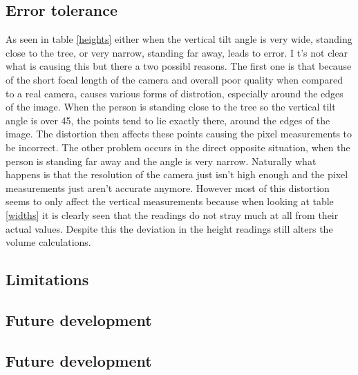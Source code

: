 \subsection{Error tolerance}
As seen in table \ref{heights} either when the vertical tilt angle is very wide, 
standing close to the tree, or very narrow, standing far away, leads to error. I
t's not clear what is causing this but there a two possibl reasons. The first one is
that because of the short focal length of the camera and overall poor quality when 
compared to a real camera, causes various forms of distrotion, especially around the 
edges of the image. When the person is standing close to the tree so the vertical tilt 
angle is over 45\degree, the points tend to lie exactly there, around the edges of 
the image. The distortion then affects these points causing the pixel measurements 
to be incorrect. The other problem occurs in the direct opposite situation, when 
the person is standing far away and the angle is very narrow. Naturally what happens 
is that the resolution of the camera just isn't high enough and the pixel measurements 
just aren't accurate anymore. However most of this distortion seems to only affect the 
vertical measurements because when looking at table \ref{widths} it is clearly seen that 
the readings do not stray much at all from their actual values. Despite this the deviation 
in the height readings still alters the volume calculations.
\subsection{Limitations}
\subsection{Future development}
\subsection{Future development}
